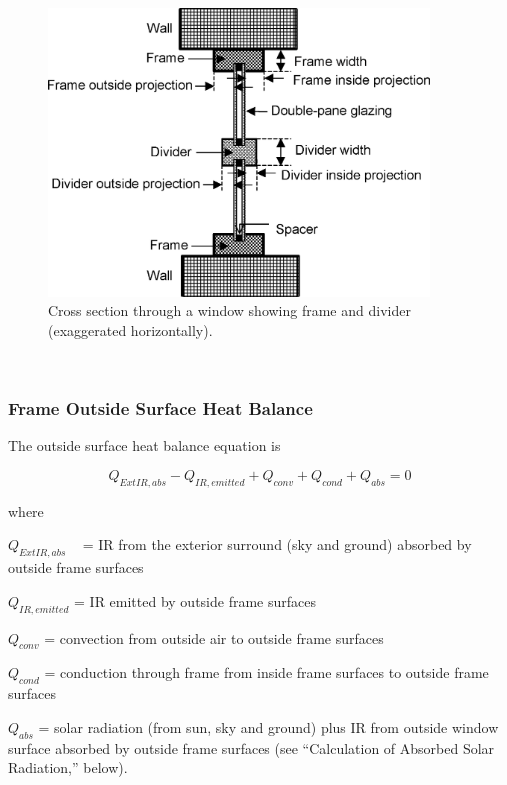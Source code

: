 \begin{figure}[hbtp] %
\centering
\includegraphics[width=0.9\textwidth, height=0.9\textheight, keepaspectratio=true]{media/image1557.png}
\caption{Cross section through a window showing frame and divider (exaggerated horizontally). \label{fig:cross-section-through-a-window-showing-frame}}
\end{figure}

\textbf{~}

\subsubsection{Frame Outside Surface Heat Balance}\label{frame-outside-surface-heat-balance}

The outside surface heat balance equation is

\begin{equation}
{Q_{ExtIR,abs}} - {Q_{IR,emitted}} + {Q_{conv}} + {Q_{cond}} + {Q_{abs}} = 0
\end{equation}

where

\({Q_{ExtIR,abs}}\) ~ = IR from the exterior surround (sky and ground) absorbed by outside frame surfaces

\({Q_{IR,emitted}}\) = IR emitted by outside frame surfaces

\({Q_{conv}}\) = convection from outside air to outside frame surfaces

\({Q_{cond}}\) = conduction through frame from inside frame surfaces to outside frame surfaces

\({Q_{abs}}\) = solar radiation (from sun, sky and ground) plus IR from outside window surface absorbed by outside frame surfaces (see ``Calculation of Absorbed Solar Radiation,'' below).


